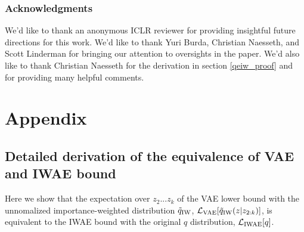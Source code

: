 \documentclass{article} %
\begin{document}
\subsubsection*{Acknowledgments}

We'd like to thank an anonymous ICLR reviewer for providing insightful future directions for this work. We'd like to thank Yuri Burda, Christian Naesseth, and Scott Linderman for bringing our attention to oversights in the paper. We'd also like to thank Christian Naesseth for the derivation in section \ref{qeiw_proof} and for providing many helpful comments.




\newpage

\section{Appendix}

\subsection{Detailed derivation of the equivalence of VAE and IWAE bound}
\label{detailed_derivation}

Here we show that the expectation over $z_2 ... z_k$ of the VAE lower bound with the unnomalized importance-weighted distribution $\tilde{q}_{\textnormal{IW}}$, $\mathcal{L}_{\textnormal{VAE}}[\tilde{q}_{\textnormal{IW}}(z|z_{2:k})]$, is equivalent to the IWAE bound with the original $q$ distribution, $\mathcal{L}_{\textnormal{IWAE}}[q]$.
\end{document}
